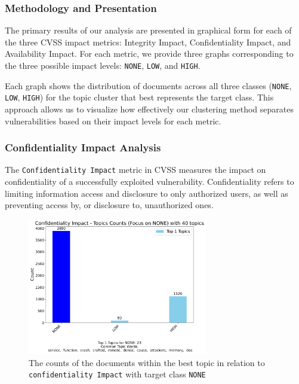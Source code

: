 \documentclass[12pt]{article}
\begin{document}
\subsubsection{Methodology and Presentation}

The primary results of our analysis are presented in graphical form for each of the three CVSS
impact metrics: Integrity Impact, Confidentiality Impact, and Availability Impact. For each metric,
we provide three graphs corresponding to the three possible impact levels: \texttt{NONE},
\texttt{LOW}, and \texttt{HIGH}.

Each graph shows the distribution of documents across all three classes (\texttt{NONE},
\texttt{LOW}, \texttt{HIGH}) for the topic cluster that best represents the target class. This
approach allows us to visualize how effectively our clustering method separates vulnerabilities
based on their impact levels for each metric.

\subsubsection{Confidentiality Impact Analysis}

The \texttt{Confidentiality Impact} metric in CVSS measures the impact on confidentiality of a
successfully exploited vulnerability. Confidentiality refers to limiting information access and
disclosure to only authorized users, as well as preventing access by, or disclosure to, unauthorized
ones.

\begin{figure}[H]
	\centering
	\includegraphics[width=0.7\textwidth]{figures/confidentialityImpact/merged_top_k_topics_category_focus_counts_confidentialityImpact_NONE_k1.pdf}
	\caption{The counts of the documents within the best topic in relation to \texttt{confidentiality Impact} with target class \texttt{NONE}}
	\label{fig:confidentialityImpact_60_NONE}

\end{figure}
\end{document}
